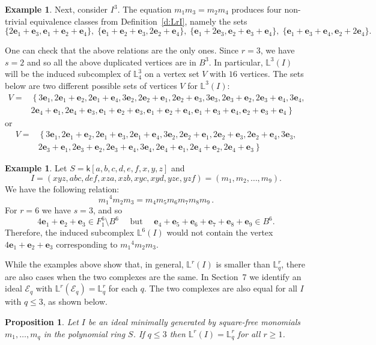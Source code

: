 \documentclass[11pt]{article}
\newtheorem{prop}[theo]{Proposition}
\theoremstyle{definition}
\newtheorem{exam}[theo]{Example}
\numberwithin{equation}{section}
\newcommand{\LL}{\mathbb{L}}
\newcommand{\Lrq}{\mathbb{L}^r_q}
\newcommand{\Lr}{\mathbb{L}^r}
\newcommand{\E}{\mathcal{E}}
\newcommand{\be}{\mathbf{e}}
\newcommand{\qbut}{\quad \mbox{ but } \quad }
\newcommand{\sfk}{\mathsf k}
\begin{document}
\begin{exam}
Next, consider $I^3$. The equation $m_1m_3=m_2m_4$ produces four
non-trivial equivalence classes from Definition~\ref{d:LrI}, namely the sets
{\small $$ \{ 2\be_1+\be_3, \be_1+\be_2+\be_4\}, \; \{ \be_1+\be_2+\be_3, 2\be_2+\be_4\}, \; \{\be_1+2\be_3, \be_2+\be_3+\be_4\}, 
\; \{\be_1+\be_3+\be_4, \be_2+2\be_4\}.$$ }

One can check that the above relations are the only ones. Since $r=3$, we have $s=2$ and so
all the above duplicated vertices are in $B^3$. In particular,
$\LL^3(I)$ will be the induced subcomplex of $\LL_4^3$ on a vertex set
$V$ with $16$ vertices. The sets below are two different possible sets
of vertices $V$ for $\LL^3(I)$:
\begin{align*}
V=&\left\{ 3\be_1, 2\be_1+\be_2, 2\be_1+\be_4, 3\be_2, 2\be_2+\be_1, 2\be_2+\be_3, 3\be_3, 2\be_3+\be_2, 2\be_3+\be_4, 3\be_4, 
\right. \\
&\left. 2\be_4+\be_1, 2\be_4+\be_3, \be_1+\be_2+\be_3, \be_1+\be_2+\be_4, \be_1+\be_3+\be_4, \be_2+\be_3+\be_4 \right\}
\end{align*}
or
\begin{align*}
V=&\left\{ 3\be_1, 2\be_1+\be_2, 2\be_1 + \be_3, 2\be_1+\be_4, 3\be_2, 2\be_2+\be_1, 2\be_2+\be_3, 2\be_2+\be_4, 3\be_3,
\right. \\
&\left. 2\be_3+\be_1,2\be_3+\be_2, 2\be_3+\be_4, 3\be_4, 2\be_4+\be_1, 2\be_4+\be_2, 2\be_4+\be_3 \right\}
\end{align*}
 \end{exam}

\begin{exam}\label{eg:9vars}
Let $S=\sfk[a,b,c,d,e,f,x,y,z]$ and $$I=(xyz, abc, def, xza, xzb, xyc, xyd, yze, yzf) = (m_1,m_2,
\ldots, m_9).$$ We have  the following relation: 
$${m_1}^4m_2m_3 =
m_4m_5m_6m_7m_8m_9\,.$$
For $r=6$ we have
$s=3$, and so $$4\be_1+\be_2+\be_3 \in F_1^6 \setminus B^6 \qbut \be_4+\be_5+\be_6+\be_7+\be_8+\be_9\in B^6.$$
Therefore, the induced subcomplex $\mathbb L^6(I)$ would not contain the vertex
$4\be_1+\be_2+\be_3$ corresponding to ${m_1}^4m_2m_3$.
\end{exam}

While the examples above show that, in general, $\Lr(I)$ is smaller than $\Lrq$, there are also cases when the two complexes are the same.  In Section~7 we identify an ideal $\E_q$ with $\Lr(\E_q)=\Lrq$ for each $q$. 
The two complexes are also equal for all $I$ with $q\le 3$, as shown below. 


\begin{prop} \label{p:Lr=L(I)}
  Let $I$ be an ideal minimally generated by
  square-free monomials $m_1,\ldots,m_q$ in the polynomial ring
  $S$. If $q \leq 3$ then $\Lr(I)=\Lrq$ for all $r \geq 1$.
\end{prop}
\end{document}
